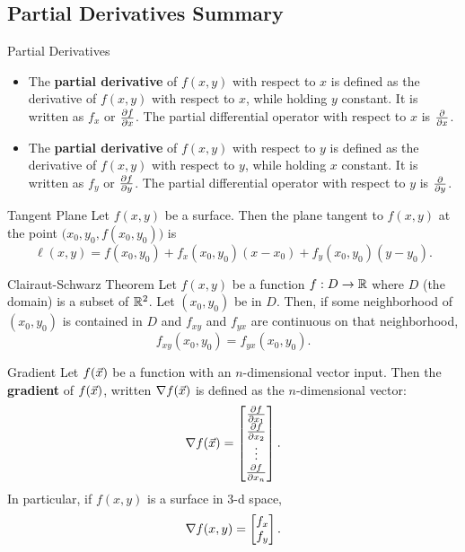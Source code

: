 \renewcommand\thesubsection{\thesection.\Alph{subsection}}
\setcounter{subsection}{18}
\subsection{Partial Derivatives Summary}

\begin{definition}{Partial Derivatives}
\begin{itemize}
\item The \textbf{partial derivative} of $f(x,y)$ with respect to $x$ is defined as the derivative of $f(x,y)$ with respect to $x$, while holding $y$ constant. It is written as $f_x$ or $\frac{\partial f}{\partial x}$. The partial differential operator with respect to $x$ is $\frac{\partial }{\partial x}$. 
\vspace{1em}
\item The \textbf{partial derivative} of $f(x,y)$ with respect to $y$ is defined as the derivative of $f(x,y)$ with respect to $y$, while holding $x$ constant. It is written as $f_y$ or $\frac{\partial f}{\partial y}$. The partial differential operator with respect to $y$ is $\frac{\partial }{\partial y}$. 
\end{itemize}
\end{definition}

\begin{definition}{Tangent Plane}
Let $f(x,y)$ be a surface. Then the plane tangent to $f(x,y)$ at the point $\big(x_0,y_0,f(x_0,y_0)\big)$ is $$\ell(x,y)=f(x_0,y_0)+f_x(x_0,y_0)(x-x_0)+f_y(x_0,y_0)(y-y_0). $$
\end{definition}

 \begin{theorem}{{Clairaut-Schwarz Theorem}}
Let $f(x,y)$ be a function $f:D\to\mathbb{R}$ where $D$ (the domain) is a subset of $\mathbb{R}^2$. Let $(x_0,y_0)$ be in $D$. Then, if some neighborhood of $(x_0,y_0)$ is contained in $D$ and $f_{xy}$ and $f_{yx}$ are continuous on that neighborhood, $$f_{xy}(x_0,y_0)=f_{yx}(x_0,y_0). $$
 \end{theorem}

 \begin{definition}{Gradient}
Let $f(\vec{x})$ be a function with an $n$-dimensional vector input. Then the \textbf{gradient} of $f(\vec{x})$, written $\nabla f(\vec{x})$ is defined as the $n$-dimensional vector:
$$\nabla f(\vec{x})=\begin{bmatrix}\frac{\partial f}{\partial x_1}\\ \frac{\partial f}{\partial x_2}\\ \vdots \\ \frac{\partial f}{\partial x_n}\end{bmatrix}. $$
In particular, if $f(x,y)$ is a surface in 3-d space, $$\nabla f(x,y)=\begin{bmatrix}f_x\\f_y\end{bmatrix}.$$
\end{definition}

